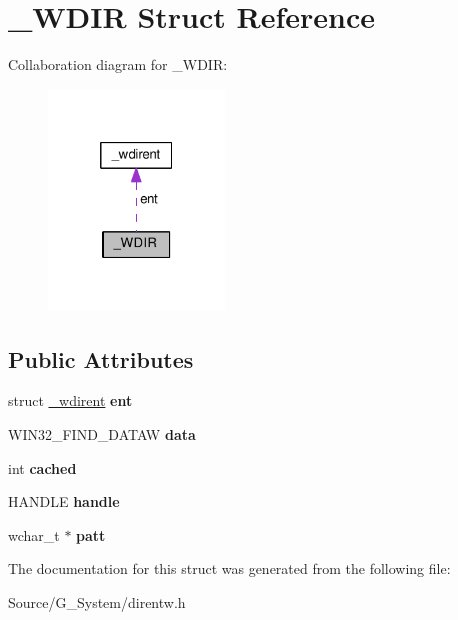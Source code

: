 \hypertarget{struct__WDIR}{}\section{\+\_\+\+W\+D\+IR Struct Reference}
\label{struct__WDIR}


Collaboration diagram for \+\_\+\+W\+D\+IR\+:
\nopagebreak
\begin{figure}[H]
\begin{center}
\leavevmode
\includegraphics[width=133pt]{struct__WDIR__coll__graph}
\end{center}
\end{figure}
\subsection*{Public Attributes}
\begin{DoxyCompactItemize}
\item 
struct \hyperlink{struct__wdirent}{\+\_\+wdirent} {\bfseries ent}\hypertarget{struct__WDIR_a84ae1457352005f813ed4b3dc1994b62}{}\label{struct__WDIR_a84ae1457352005f813ed4b3dc1994b62}

\item 
W\+I\+N32\+\_\+\+F\+I\+N\+D\+\_\+\+D\+A\+T\+AW {\bfseries data}\hypertarget{struct__WDIR_a065b17b666ee06c4e8068d8accb0eef9}{}\label{struct__WDIR_a065b17b666ee06c4e8068d8accb0eef9}

\item 
int {\bfseries cached}\hypertarget{struct__WDIR_a9b7432df163d1e291ba5925347fd4af3}{}\label{struct__WDIR_a9b7432df163d1e291ba5925347fd4af3}

\item 
H\+A\+N\+D\+LE {\bfseries handle}\hypertarget{struct__WDIR_a694510e166fd3e797b3e15b9e4b3810a}{}\label{struct__WDIR_a694510e166fd3e797b3e15b9e4b3810a}

\item 
wchar\+\_\+t $\ast$ {\bfseries patt}\hypertarget{struct__WDIR_a700ff3a1096fb36452c571b0f55b4e60}{}\label{struct__WDIR_a700ff3a1096fb36452c571b0f55b4e60}

\end{DoxyCompactItemize}


The documentation for this struct was generated from the following file\+:\begin{DoxyCompactItemize}
\item 
Source/\+G\+\_\+\+System/direntw.\+h\end{DoxyCompactItemize}
